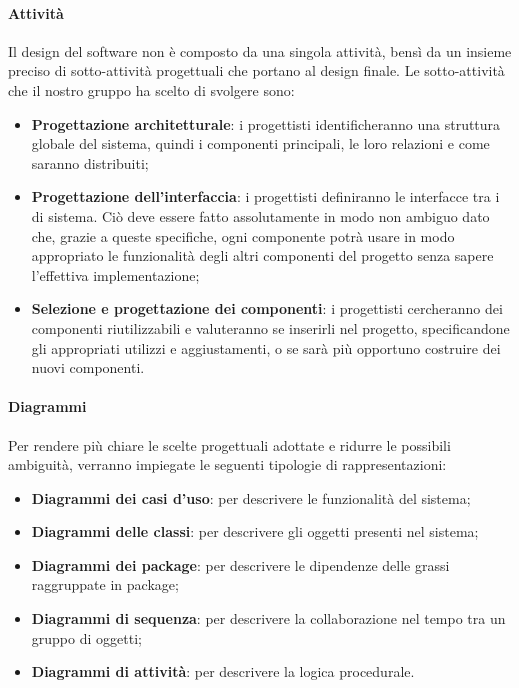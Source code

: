 \paragraph{Attività}\Spazio
Il design del software non è composto da una singola attività, bensì da un insieme preciso di sotto-attività progettuali che portano al design finale.
Le sotto-attività che il nostro gruppo ha scelto di svolgere sono:
	\begin{itemize}
	\item\textbf{{Progettazione architetturale}}: i progettisti identificheranno una struttura globale del sistema, quindi i componenti principali, le loro relazioni e come saranno distribuiti;
	\item\textbf{{Progettazione dell'interfaccia}}: i progettisti definiranno le interfacce tra i  di sistema. Ciò deve essere fatto assolutamente in modo non ambiguo dato che, grazie a queste specifiche, ogni componente potrà usare in modo appropriato le funzionalità degli altri componenti del progetto senza sapere l'effettiva implementazione;
	\item\textbf{{Selezione e progettazione dei componenti}}: i progettisti cercheranno dei componenti riutilizzabili e valuteranno se inserirli nel progetto, specificandone gli appropriati utilizzi e aggiustamenti, o se sarà più opportuno costruire dei nuovi componenti.
\end{itemize}
\paragraph{Diagrammi}\Spazio
Per rendere più chiare le scelte progettuali adottate e ridurre le possibili
ambiguità, verranno impiegate le seguenti tipologie di rappresentazioni:
\begin{itemize}
	\item \textbf{Diagrammi dei casi d’uso}: per descrivere le funzionalità del sistema;
	\item \textbf{Diagrammi delle classi}: per descrivere gli oggetti presenti nel sistema;
	\item \textbf{Diagrammi dei package}: per descrivere le dipendenze delle grassi raggruppate in package;
	\item \textbf{Diagrammi di sequenza}: per descrivere la collaborazione nel tempo
	tra un gruppo di oggetti;

	\item \textbf{Diagrammi di attività}: per descrivere la logica procedurale.
\end{itemize}
